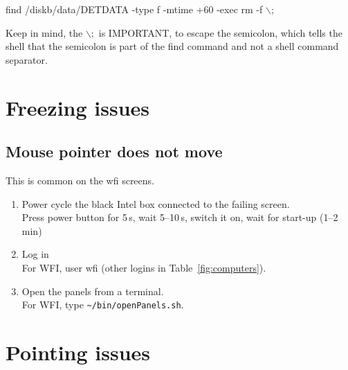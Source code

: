 \documentclass[11pt,fleqn,a4paper]{book}
\def\home{\textasciitilde{}}
\begin{document}
find /diskb/data/DETDATA -type f -mtime +60 -exec rm -f {} $\backslash;$

Keep in mind, the $\backslash;$ is IMPORTANT, to escape the semicolon, which tells the shell that the semicolon is part of the find command and not a shell command separator. 

\section{Freezing issues}

\subsection{Mouse pointer does not move}
This is common on the \gls{wfi} screens.

\begin{enumerate}
    \item Power cycle the black Intel box connected to the failing screen.\\
          Press power button for 5\,s, wait 5--10\,s, switch it on, wait for
          start-up (1--2\,min)
    \item Log in\\ 
          For WFI, user wfi (other logins in Table~\ref{fig:computers}).
    \item Open the panels from a terminal.\\
          For WFI, type \texttt{\home/bin/openPanels.sh}.
\end{enumerate}

\section{Pointing issues}
\end{document}
